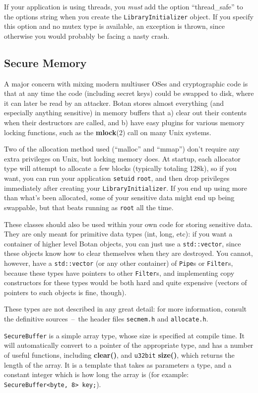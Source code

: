 \documentclass{article}
\newcommand{\filename}[1]{\texttt{#1}}
\newcommand{\function}[1]{\textbf{#1}}
\newcommand{\type}[1]{\texttt{#1}}
\begin{document}
If your application is using threads, you \emph{must} add the option
``thread\_safe'' to the options string when you create the
\type{LibraryInitializer} object. If you specify this option and no mutex type
is available, an exception is thrown, since otherwise you would probably be
facing a nasty crash.

\subsection{Secure Memory}

A major concern with mixing modern multiuser OSes and cryptographic
code is that at any time the code (including secret keys) could be
swapped to disk, where it can later be read by an attacker. Botan
stores almost everything (and especially anything sensitive) in memory
buffers that a) clear out their contents when their destructors are
called, and b) have easy plugins for various memory locking functions,
such as the \function{mlock}(2) call on many Unix systems.

Two of the allocation method used (``malloc'' and ``mmap'') don't
require any extra privileges on Unix, but locking memory does. At
startup, each allocator type will attempt to allocate a few blocks
(typically totaling 128k), so if you want, you can run your
application \texttt{setuid} \texttt{root}, and then drop privileges
immediately after creating your \type{LibraryInitializer}. If you end
up using more than what's been allocated, some of your sensitive data
might end up being swappable, but that beats running as \texttt{root}
all the time.

These classes should also be used within your own code for storing
sensitive data. They are only meant for primitive data types (int,
long, etc): if you want a container of higher level Botan objects, you
can just use a \verb|std::vector|, since these objects know how to
clear themselves when they are destroyed. You cannot, however, have a
\verb|std::vector| (or any other container) of \type{Pipe}s or
\type{Filter}s, because these types have pointers to other
\type{Filter}s, and implementing copy constructors for these types
would be both hard and quite expensive (vectors of pointers to such
objects is fine, though).

These types are not described in any great detail: for more information,
consult the definitive sources~--~the header files \filename{secmem.h} and
\filename{allocate.h}.

\type{SecureBuffer} is a simple array type, whose size is specified at compile
time. It will automatically convert to a pointer of the appropriate type, and
has a number of useful functions, including \function{clear()}, and
\type{u32bit} \function{size()}, which returns the length of the array. It is a
template that takes as parameters a type, and a constant integer which is how
long the array is (for example: \verb|SecureBuffer<byte, 8> key;|).
\end{document}
